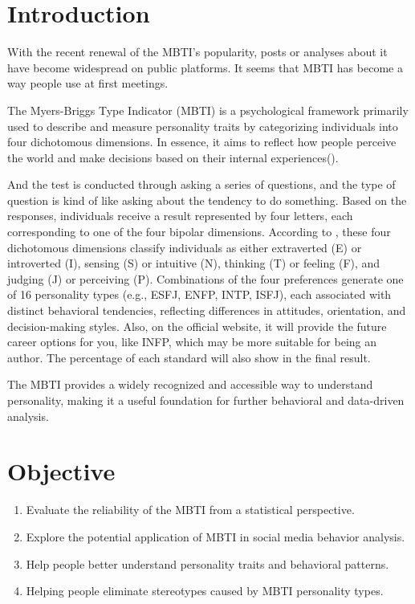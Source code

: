 \documentclass[12pt]{article}
\begin{document}
	
	
	
	\section{Introduction}
	With the recent renewal of the MBTI's popularity, posts or analyses about it have become widespread on public platforms. It seems that MBTI has become a way people use at first meetings.
	
	The Myers-Briggs Type Indicator (MBTI) is a psychological framework primarily used to describe and measure personality traits by categorizing individuals into four dichotomous dimensions. In essence, it aims to reflect how people perceive the world and make decisions based on their internal experiences(\cite{yang2022research}).
	
	And the test is conducted through asking a series of questions, and the type of question is kind of like asking about the tendency to do something. Based on the responses, individuals receive a result represented by four letters, each corresponding to one of the four bipolar dimensions. According to \textcite{boyle1995mbti}, these four dichotomous dimensions classify individuals as either extraverted (E) or introverted (I), sensing (S) or intuitive (N), thinking (T) or feeling (F), and judging (J) or perceiving (P). Combinations of the four preferences generate one of 16 personality types (e.g., ESFJ, ENFP, INTP, ISFJ), each associated with distinct behavioral tendencies, reflecting differences in attitudes, orientation, and decision-making styles. Also, on the official website, it will provide the future career options for you, like INFP, which may be more suitable for being an author. The percentage of each standard will also show in the final result.
	
	The MBTI provides a widely recognized and accessible way to understand personality, making it a useful foundation for further behavioral and data-driven analysis.
	
	\section{Objective}
	\begin{enumerate} 
		\item Evaluate the reliability of the MBTI from a statistical perspective.    \item Explore the potential application of MBTI in social media behavior analysis.    
		\item Help people better understand personality traits and behavioral patterns.    
		\item Helping people eliminate stereotypes caused by MBTI personality types.
	\end{enumerate}
	
\end{document}
